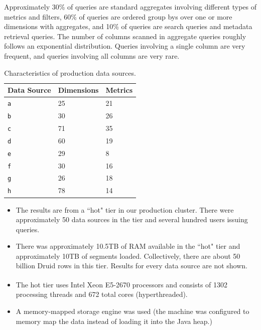 \documentclass{vldb}
\begin{document}
Approximately 30\% of queries are standard aggregates involving different types
of metrics and filters, 60\% of queries are ordered group bys over one or more
dimensions with aggregates, and 10\% of queries are search queries and metadata
retrieval queries. The number of columns scanned in aggregate queries roughly
follows an exponential distribution. Queries involving a single column are very
frequent, and queries involving all columns are very rare.

\begin{table}
  \centering
  \scriptsize\begin{tabular}{| l | l | l |}
    \hline
    \textbf{Data Source} & \textbf{Dimensions} & \textbf{Metrics} \\ \hline
    \texttt{a} & 25 & 21 \\ \hline
    \texttt{b} & 30 & 26 \\ \hline
    \texttt{c} & 71 & 35 \\ \hline
    \texttt{d} & 60 & 19 \\ \hline
    \texttt{e} & 29 & 8 \\ \hline
    \texttt{f} & 30 & 16 \\ \hline
    \texttt{g} & 26 & 18 \\ \hline
    \texttt{h} & 78 & 14 \\ \hline
  \end{tabular}
  \normalsize
  \caption{Characteristics of production data sources.}
  \label{tab:datasources}
\end{table}

\begin{itemize}[leftmargin=*,beginpenalty=5000,topsep=0pt]
\item The results are from a ``hot" tier in our production cluster. There were
approximately 50 data sources in the tier and several hundred users issuing
queries.

\item There was approximately 10.5TB of RAM available in the ``hot" tier and
approximately 10TB of segments loaded. Collectively,
there are about 50 billion Druid rows in this tier. Results for
every data source are not shown.

\item The hot tier uses Intel\textsuperscript{\textregistered} Xeon\textsuperscript{\textregistered} E5-2670 processors and consists of 1302 processing
threads and 672 total cores (hyperthreaded).

\item A memory-mapped storage engine was used (the machine was configured to
    memory map the data instead of loading it into the Java heap.)
\end{itemize}
\end{document}
